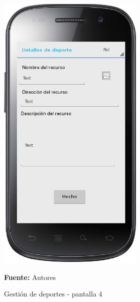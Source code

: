 \begin{figure}[!htb]
  \begin{center}
    \includegraphics[width=7cm]{./imagenes/UI/Deportes/gestion_deportes_4.png}
    \caption{Gestión de deportes - pantalla 4}
    \label{fig:gestion_deportes_4}
    \textbf{Fuente:}  Autores
  \end{center}
\end{figure}

